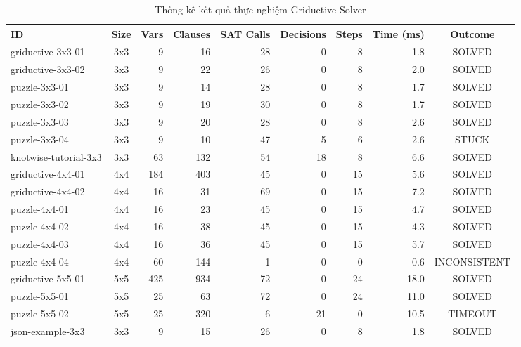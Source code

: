 \begin{table}[htbp]
\centering
\caption{Thống kê kết quả thực nghiệm Griductive Solver}
\begin{tabular}{|l|c|r|r|r|r|r|r|c|}
\hline
\textbf{ID} & \textbf{Size} & \textbf{Vars} & \textbf{Clauses} & \textbf{SAT Calls} & \textbf{Decisions} & \textbf{Steps} & \textbf{Time (ms)} & \textbf{Outcome} \\
\hline
griductive-3x3-01 & 3x3 & 9 & 16 & 28 & 0 & 8 & 1.8 & SOLVED \\
griductive-3x3-02 & 3x3 & 9 & 22 & 26 & 0 & 8 & 2.0 & SOLVED \\
puzzle-3x3-01 & 3x3 & 9 & 14 & 28 & 0 & 8 & 1.7 & SOLVED \\
puzzle-3x3-02 & 3x3 & 9 & 19 & 30 & 0 & 8 & 1.7 & SOLVED \\
puzzle-3x3-03 & 3x3 & 9 & 20 & 28 & 0 & 8 & 2.6 & SOLVED \\
puzzle-3x3-04 & 3x3 & 9 & 10 & 47 & 5 & 6 & 2.6 & STUCK \\
knotwise-tutorial-3x3 & 3x3 & 63 & 132 & 54 & 18 & 8 & 6.6 & SOLVED \\
griductive-4x4-01 & 4x4 & 184 & 403 & 45 & 0 & 15 & 5.6 & SOLVED \\
griductive-4x4-02 & 4x4 & 16 & 31 & 69 & 0 & 15 & 7.2 & SOLVED \\
puzzle-4x4-01 & 4x4 & 16 & 23 & 45 & 0 & 15 & 4.7 & SOLVED \\
puzzle-4x4-02 & 4x4 & 16 & 38 & 45 & 0 & 15 & 4.3 & SOLVED \\
puzzle-4x4-03 & 4x4 & 16 & 36 & 45 & 0 & 15 & 5.7 & SOLVED \\
puzzle-4x4-04 & 4x4 & 60 & 144 & 1 & 0 & 0 & 0.6 & INCONSISTENT \\
griductive-5x5-01 & 5x5 & 425 & 934 & 72 & 0 & 24 & 18.0 & SOLVED \\
puzzle-5x5-01 & 5x5 & 25 & 63 & 72 & 0 & 24 & 11.0 & SOLVED \\
puzzle-5x5-02 & 5x5 & 25 & 320 & 6 & 21 & 0 & 10.5 & TIMEOUT \\
json-example-3x3 & 3x3 & 9 & 15 & 26 & 0 & 8 & 1.8 & SOLVED \\
\hline
\end{tabular}
\end{table}
